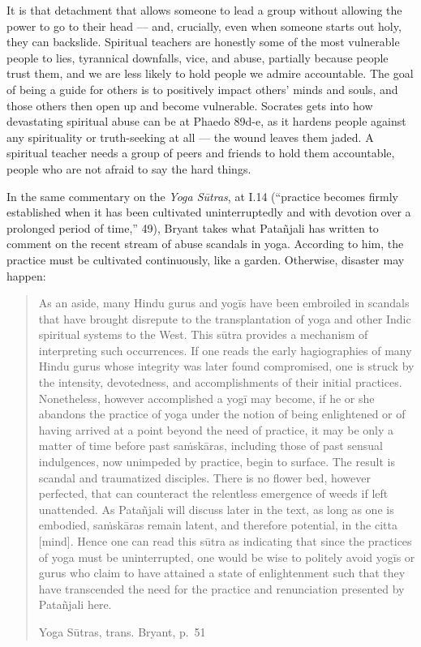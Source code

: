 \documentclass[
]{book}
\begin{document}
It is that detachment that allows someone to lead a group without allowing the power to go to their head --- and, crucially, even when someone starts out holy, they can backslide. Spiritual teachers are honestly some of the most vulnerable people to lies, tyrannical downfalls, vice, and abuse, partially because people trust them, and we are less likely to hold people we admire accountable. The goal of being a guide for others is to positively impact others' minds and souls, and those others then open up and become vulnerable. Socrates gets into how devastating spiritual abuse can be at Phaedo 89d-e, as it hardens people against any spirituality or truth-seeking at all --- the wound leaves them jaded. A spiritual teacher needs a group of peers and friends to hold them accountable, people who are not afraid to say the hard things.

In the same commentary on the \emph{Yoga Sūtras}, at I.14 (``practice becomes firmly established when it has been cultivated uninterruptedly and with devotion over a prolonged period of time,'' 49), Bryant takes what Patañjali has written to comment on the recent stream of abuse scandals in yoga. According to him, the practice must be cultivated continuously, like a garden. Otherwise, disaster may happen:

\begin{quote}
As an aside, many Hindu gurus and yogīs have been embroiled in scandals that have brought disrepute to the transplantation of yoga and other Indic spiritual systems to the West. This sūtra provides a mechanism of interpreting such occurrences. If one reads the early hagiographies of many Hindu gurus whose integrity was later found compromised, one is struck by the intensity, devotedness, and accomplishments of their initial practices. Nonetheless, however accomplished a yogī may become, if he or she abandons the practice of yoga under the notion of being enlightened or of having arrived at a point beyond the need of practice, it may be only a matter of time before past saṁskāras, including those of past sensual indulgences, now unimpeded by practice, begin to surface. The result is scandal and traumatized disciples. There is no flower bed, however perfected, that can counteract the relentless emergence of weeds if left unattended. As Patañjali will discuss later in the text, as long as one is embodied, saṁskāras remain latent, and therefore potential, in the citta {[}mind{]}. Hence one can read this sūtra as indicating that since the practices of yoga must be uninterrupted, one would be wise to politely avoid yogīs or gurus who claim to have attained a state of enlightenment such that they have transcended the need for the practice and renunciation presented by Patañjali here.

Yoga Sūtras, trans. Bryant, p.~51
\end{quote}
\end{document}
